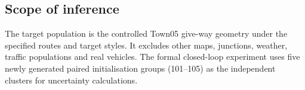 \subsection{Scope of inference}

The target population is the controlled Town05 give-way geometry under the
specified routes and target styles. It excludes other maps, junctions,
weather, traffic populations and real vehicles. The formal closed-loop
experiment uses five newly generated paired initialisation groups (101--105)
as the independent clusters for uncertainty calculations.
